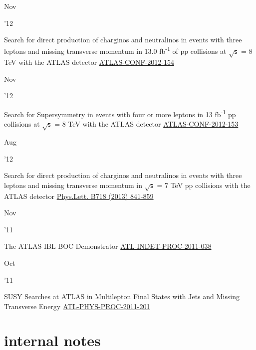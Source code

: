\documentclass[]{cv} %
\begin{document}
\begin{entrylist}
  \entry
  {\parbox[t]{\parboxWidthOne}{Nov}\parbox[t]{\parboxWidthTwo}{\hfill '12}}
  {Search for direct production of charginos and neutralinos in events with three leptons and missing transverse momentum in 13.0
  fb\textsuperscript{-1} of pp collisions at $\sqrt{\mathsf{s}}$ = 8 TeV with the ATLAS detector}
  {\href{https://cds.cern.ch/record/1493493}{ATLAS-CONF-2012-154}}
  {\vspace*{\spacingPubs}}

  \entry
  {\parbox[t]{\parboxWidthOne}{Nov}\parbox[t]{\parboxWidthTwo}{\hfill '12}}
  {Search for Supersymmetry in events with four or more leptons in 13 fb\textsuperscript{-1} pp collisions at $\sqrt{\mathsf{s}}$
  = 8 TeV with the ATLAS detector}
  {\href{https://cds.cern.ch/record/1493492}{ATLAS-CONF-2012-153}}
  {\vspace*{\spacingPubs}}

  \entry
  {\parbox[t]{\parboxWidthOne}{Aug}\parbox[t]{\parboxWidthTwo}{\hfill '12}}
  {Search for direct production of charginos and neutralinos in events with three leptons and missing transverse momentum in $\sqrt{\mathsf{s}}$ =
  7 TeV pp collisions with the ATLAS detector}
  {\href{http://dx.doi.org/10.1016/j.physletb.2012.11.039}{Phys.Lett. B718 (2013) 841-859}}
  {\vspace*{\spacingPubs}}

  \entry
  {\parbox[t]{\parboxWidthOne}{Nov}\parbox[t]{\parboxWidthTwo}{\hfill '11}}
  {The ATLAS IBL BOC Demonstrator}
  {\href{https://cds.cern.ch/record/1401224}{ATL-INDET-PROC-2011-038}}
  {\vspace*{\spacingPubs}}

  \entry
  {\parbox[t]{\parboxWidthOne}{Oct}\parbox[t]{\parboxWidthTwo}{\hfill '11}}
  {SUSY Searches at ATLAS in Multilepton Final States with Jets and Missing Transverse Energy}
  {\href{https://cds.cern.ch/record/1394331}{ATL-PHYS-PROC-2011-201}}
  {\vspace*{\spacingPubs}}

\end{entrylist}

\ifinternalNotes
\section{internal notes}
\end{document}
